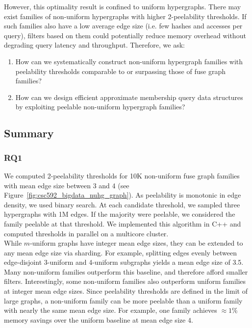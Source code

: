 \noindent
However, this optimality result is confined to uniform hypergraphs. There may exist families of non-uniform hypergraphs with higher 2-peelability thresholds. If
such families also have a low average edge size (i.e. few hashes and accesses per query), filters based on them could potentially reduce memory overhead without
degrading query latency and throughput. Therefore, we ask:

\begin{enumerate}
    \item How can we systematically construct non-uniform hypergraph families with peelability thresholds comparable to or surpassing those of fuse graph 
    families?
    \item How can we design efficient approximate membership query data structures by exploiting peelable non-uniform hypergraph families?
\end{enumerate}

\subsection{Summary}

\subsubsection{RQ1}

We computed 2-peelability thresholds for 10K non-uniform fuse graph families with mean edge size between 3 and 4 (see 
Figure~\ref{fig:csc592_bigdata_nuhg_graph}). As peelability is monotonic in edge density, we used binary search. At each candidate threshold, we sampled 
three hypergraphs with 1M edges. If the majority were peelable, we considered the family peelable at that threshold. We implemented this algorithm in C++ and 
computed thresholds in parallel on a multicore cluster. \\



\noindent
While $m$-uniform graphs have integer mean edge sizes, they can be extended to any mean edge size via sharding. For example, splitting edges evenly between 
edge-disjoint 3-uniform and 4-uniform subgraphs yields a mean edge size of 3.5. Many non-uniform families outperform this baseline, and therefore afford 
smaller filters. Interestingly, some non-uniform families also outperform uniform families at integer mean edge sizes. Since peelability thresholds are defined 
in the limit of large graphs, a non-uniform family can be more peelable than a uniform family with nearly the same mean edge size. For example, one family 
achieves $\approx 1$\% memory savings over the uniform baseline at mean edge size $4$. \\

